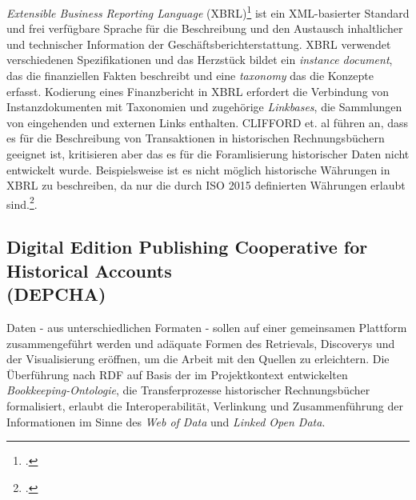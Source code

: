 \documentclass[12pt,a4paper]{article}
\begin{document}
\textit{Extensible Business Reporting Language }(XBRL)\footcite{engel2003extensible} ist ein XML-basierter Standard und frei verfügbare Sprache für die Beschreibung und den Austausch inhaltlicher und technischer Information der Geschäftsberichterstattung. XBRL verwendet verschiedenen Spezifikationen und das Herzstück bildet ein \textit{instance document}, das die finanziellen Fakten beschreibt und eine \textit{taxonomy} das die Konzepte erfasst. Kodierung eines Finanzbericht in XBRL erfordert die Verbindung von Instanzdokumenten mit Taxonomien und zugehörige \textit{Linkbases}, die Sammlungen von eingehenden und externen Links enthalten. CLIFFORD et. al führen an, dass es für die Beschreibung von Transaktionen in historischen Rechnungsbüchern geeignet ist, kritisieren aber das es für die Foramlisierung historischer Daten nicht entwickelt wurde. Beispielsweise ist es nicht möglich historische Währungen in XBRL zu beschreiben, da nur die durch ISO 2015 definierten Währungen erlaubt sind.\footcite[][S.7-9]{tomasekmedea}.

\subsection{Digital Edition Publishing Cooperative for Historical Accounts \\ (DEPCHA)}
\label{DEPCHA}

Daten - aus unterschiedlichen Formaten - sollen auf einer gemeinsamen Plattform zusammengeführt werden und adäquate Formen des Retrievals, Discoverys und der Visualisierung eröffnen, um die Arbeit mit den Quellen zu erleichtern. Die Überführung nach RDF auf Basis der im Projektkontext entwickelten \textit{Bookkeeping-Ontologie}, die Transferprozesse historischer Rechnungsbücher formalisiert, erlaubt die Interoperabilität, Verlinkung und Zusammenführung der Informationen im Sinne des \textit{Web of Data} und \textit{Linked Open Data}.
\end{document}
